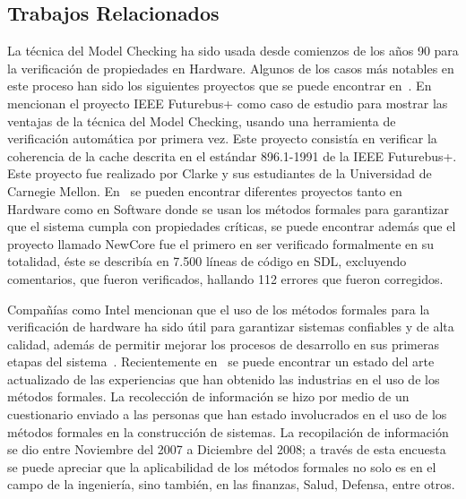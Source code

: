 \subsection{Trabajos Relacionados}

La t\'ecnica del Model Checking ha sido usada desde comienzos de los años 90 para la verificaci\'on de propiedades en Hardware. Algunos de los casos m\'as notables en este proceso han sido los siguientes proyectos que se puede encontrar en~\cite{Clarke1996, Woodcock2009}.  En~\cite{Clarke1996} mencionan el proyecto IEEE Futurebus+ como caso de estudio para mostrar las ventajas de la t\'ecnica del Model Checking, usando una herramienta de verificaci\'on autom\'atica por primera vez. Este proyecto consist\'ia en verificar la coherencia de la cache descrita en el est\'andar 896.1-1991 de la IEEE Futurebus+. Este proyecto fue realizado por Clarke y sus estudiantes de la Universidad de Carnegie Mellon. En~\cite{Clarke1996} se pueden encontrar diferentes proyectos tanto en Hardware como en Software donde se usan los m\'etodos formales para garantizar que el sistema cumpla con propiedades cr\'iticas, se puede encontrar adem\'as que el proyecto llamado NewCore fue el primero en ser verificado formalmente en su totalidad, \'este se describ\'ia en 7.500 l\'ineas de c\'odigo en SDL, excluyendo comentarios, que fueron verificados, hallando 112 errores que fueron corregidos.

Compañ\'ias como Intel mencionan que el uso de los m\'etodos formales para la verificaci\'on de hardware ha sido \'util para garantizar sistemas confiables y de alta calidad, adem\'as de permitir mejorar los procesos de desarrollo en sus primeras etapas del sistema~\cite{Fix2008}. 
Recientemente en~\cite{Woodcock2009} se puede encontrar un estado del arte actualizado de las experiencias que han obtenido las industrias en el uso de los m\'etodos formales. La recolecci\'on de informaci\'on se hizo por medio de un cuestionario enviado a las personas que han estado involucrados en el uso de los m\'etodos formales en la construcci\'on de sistemas. La recopilaci\'on de informaci\'on se dio entre Noviembre del 2007 a Diciembre del 2008; a trav\'es de esta encuesta se puede apreciar que la aplicabilidad de los m\'etodos formales no solo es en el campo de la ingenier\'ia, sino tambi\'en, en las finanzas, Salud, Defensa, entre otros.  

